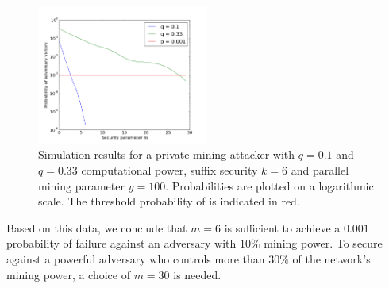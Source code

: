 \begin{figure}[h]
    \caption{\label{fig.nipopow-attack-experiment}
        Simulation results for a private mining attacker with $q = 0.1$ and $q
        = 0.33$ computational power, suffix security $k = 6$ and parallel
        mining parameter $y = 100$. Probabilities are plotted on a logarithmic
        scale. The threshold probability of \cite{bitcoin} is indicated in red.
    }
    \centering
    \includegraphics[width=0.5\textwidth,keepaspectratio]{figures/nipopow-attack-experiment.png}
\end{figure}

Based on this data, we conclude that $m = 6$ is sufficient to achieve a $0.001$
probability of failure against an adversary with $10\%$ mining power. To secure
against a powerful adversary who controls more than $30\%$ of the network's
mining power, a choice of $m = 30$ is needed.
